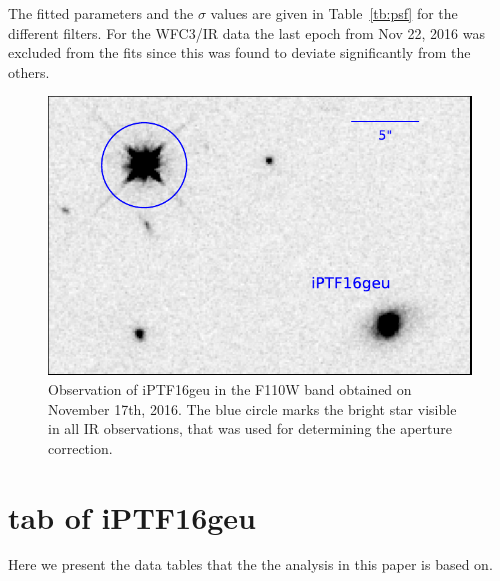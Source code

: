 \documentclass[a4paper,fleqn,usenatbib]{mnras}
\newcommand{\geu}{iPTF16geu\xspace}
\newcommand{\sn}{SN\xspace}
\newcommand{\wfcir}{WFC3/IR\xspace}
\begin{document}
The fitted parameters and the $\sigma$ values are given in Table~\ref{tb:psf} for the different filters.  For the \wfcir data the last 
epoch from Nov 22, 2016 was excluded from the fits since this was found to deviate significantly from the others.

\begin{table}
\centering
\caption{%
   Table of the derived PSF parameters and the estimated standard deviations PSF and aperture photometry 
   for all stars in each given.  Here, the full width at half maximum was calculated as 
   $\mathrm{FWHM} = 2\gamma\left(2^{1/\alpha}-1\right)^{1/2}$. See the text for further details.
  \label{tb:psf}
}

\end{table}



\begin{figure}
\centering
\includegraphics[width=\columnwidth]{psf_ir_star.pdf}
\caption{%
	Observation of \geu in the F110W band obtained on November 17th, 2016.  The blue circle marks the bright star visible in
	all IR observations, that was used for determining the aperture correction.
	\label{fig:psfnir}
}
\end{figure}



\section{tab of \geu}
Here we present the data tables that the the analysis in this paper is based on.

\begin{landscape}
\begin{table}
	\centering
	\caption{%
		Derived photometry for the four lensed \sn images.  The first error quoted for each measurement is the statistical
		uncertainty that is expected to uncorrelated between epochs.  This includes the expected PSF variations discussed
		in \S\ref{sec:wfcpsf}.  The second error, is the systematic error from the background model fit discussed in the text.
		This is will be correlated for measurements obtained with the same filter.
	\label{tb:resolvflux}}
	
\end{table}
\end{landscape}



\bsp	%
\label{lastpage}
\end{document}

